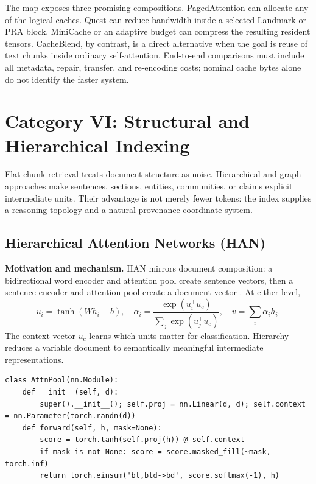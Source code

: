 The map exposes three promising compositions. PagedAttention can allocate any of the
logical caches. Quest can reduce bandwidth inside a selected Landmark or PRA block.
MiniCache or an adaptive budget can compress the resulting resident tensors. CacheBlend,
by contrast, is a direct alternative when the goal is reuse of text chunks inside ordinary
self-attention. End-to-end comparisons must include all metadata, repair, transfer, and
re-encoding costs; nominal cache bytes alone do not identify the faster system.

\section{Category VI: Structural and Hierarchical Indexing}

Flat chunk retrieval treats document structure as noise.  Hierarchical and graph approaches
make sentences, sections, entities, communities, or claims explicit intermediate units.
Their advantage is not merely fewer tokens: the index supplies a reasoning topology and a
natural provenance coordinate system.

\subsection{Hierarchical Attention Networks (HAN)}

\textbf{Motivation and mechanism.} HAN mirrors document composition: a bidirectional word
encoder and attention pool create sentence vectors, then a sentence encoder and attention
pool create a document vector \citep{yang2016han}.  At either level,
\begin{equation}
u_i=\tanh(Wh_i+b),\quad
\alpha_i=\frac{\exp(u_i^\top u_c)}{\sum_j\exp(u_j^\top u_c)},\quad
v=\sum_i\alpha_i h_i.
\end{equation}
The context vector $u_c$ learns which units matter for classification.  Hierarchy reduces a
variable document to semantically meaningful intermediate representations.

\begin{lstlisting}[caption={Reusable hierarchical attention pool}]
class AttnPool(nn.Module):
    def __init__(self, d):
        super().__init__(); self.proj = nn.Linear(d, d); self.context = nn.Parameter(torch.randn(d))
    def forward(self, h, mask=None):
        score = torch.tanh(self.proj(h)) @ self.context
        if mask is not None: score = score.masked_fill(~mask, -torch.inf)
        return torch.einsum('bt,btd->bd', score.softmax(-1), h)
\end{lstlisting}


